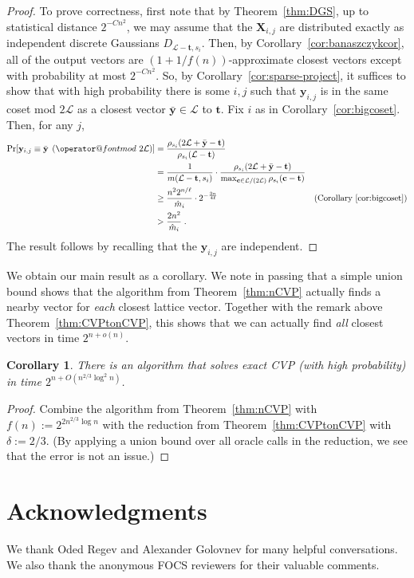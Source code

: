 \documentclass[11pt]{article}
\makeatletter
\newtheorem{corollary}[theorem]{Corollary}
\renewcommand{\vec}[1]{\ensuremath{\mathbf{#1}}}
\def\imod#1{\allowbreak\mkern8mu({\operator@font mod}\,\,#1)}
\newcommand{\lat}{\mathcal{L}}
\makeatother
\begin{document}
\begin{proof}
To prove correctness, first note that by Theorem~\ref{thm:DGS}, up to statistical distance $2^{-Cn^2}$, we may assume that the $\vec{X}_{i,j}$ are distributed exactly as independent discrete Gaussians $D_{\lat - \vec{t}, s_i}$. Then, by Corollary~\ref{cor:banaszczykcor}, all of the output vectors are $(1+1/f(n))$-approximate closest vectors except with probability at most $2^{-Cn^2}$. So, by Corollary~\ref{cor:sparse-project}, it suffices to show that with high probability there is some $i,j$ such that $\vec{y}_{i,j}$ is in the same coset mod $2\lat$ as a closest vector $\bar{\vec{y}} \in \lat$ to $\vec{t}$. Fix $i$ as in Corollary~\ref{cor:bigcoset}. Then, for any $j$,
\begin{align*}
\Pr[\vec{y}_{i,j} \equiv \bar{\vec{y}} \imod{2\lat}] &= \frac{ \rho_{s_i}(2\lat + \bar{\vec{y}} - \vec{t})}{\rho_{s_i}(\lat - \vec{t})}  \\
&= \frac{1}{m(\lat - \vec{t}, s_i)} \cdot \frac{ \rho_{s_i}(2\lat + \bar{\vec{y}} - \vec{t})}{\max_{\vec{c} \in \lat/(2\lat)}\rho_{s_i}(\vec{c} - \vec{t})}\\
&\geq \frac{n^2 2^{n/\ell}}{\hat{m}_i}\cdot 2^{-\frac{3n}{4\ell}} &\text{(Corollary~\ref{cor:bigcoset})}\\
&> \frac{2n^2}{\hat{m}_i}
\;.
\end{align*}
The result follows by recalling that the $\vec{y}_{i,j}$ are independent.
\end{proof}

We obtain our main result as a corollary. We note in passing that a simple union bound shows that the algorithm from Theorem~\ref{thm:nCVP} actually finds a nearby vector for \emph{each} closest lattice vector. Together with the remark above Theorem~\ref{thm:CVPtonCVP}, this shows that we can actually find \emph{all} closest vectors in time $2^{n+o(n)}$.

\begin{corollary}
\label{cor:CVP}
There is an algorithm that solves \emph{exact} CVP (with high probability) in time $2^{n+O(n^{2/3}\log^2 n)}$.
\end{corollary}
\begin{proof}
Combine the algorithm from Theorem~\ref{thm:nCVP} with $f(n) := 2^{2n^{2/3} \log n}$ with the reduction from Theorem~\ref{thm:CVPtonCVP} with $\delta := 2/3$. (By applying a union bound over all oracle calls in the reduction, we see that the error is not an issue.)
\end{proof}

\section*{Acknowledgments } 
We thank Oded Regev and Alexander Golovnev for many helpful conversations. We also thank the anonymous FOCS reviewers for their valuable comments.
\end{document}
